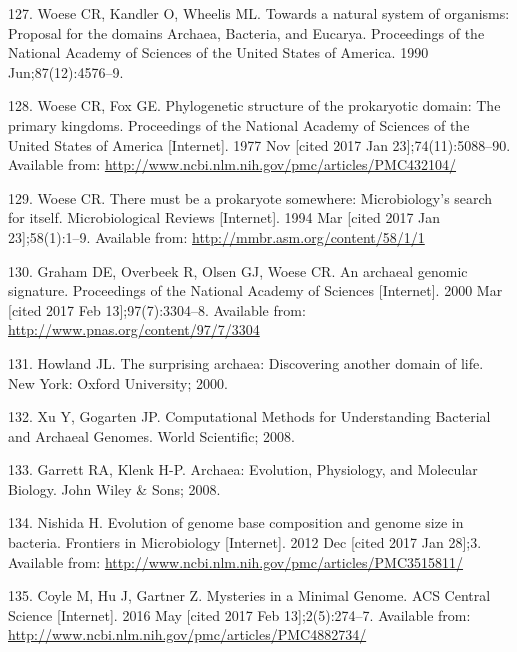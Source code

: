 \documentclass[12pt,twoside]{reedthesis}
\begin{document}
  \hypertarget{ref-woese_towards_1990}{}
  127. Woese CR, Kandler O, Wheelis ML. Towards a natural system of
  organisms: Proposal for the domains Archaea, Bacteria, and Eucarya.
  Proceedings of the National Academy of Sciences of the United States of
  America. 1990 Jun;87(12):4576--9.
  
  \hypertarget{ref-woese_phylogenetic_1977}{}
  128. Woese CR, Fox GE. Phylogenetic structure of the prokaryotic domain:
  The primary kingdoms. Proceedings of the National Academy of Sciences of
  the United States of America {[}Internet{]}. 1977 Nov {[}cited 2017 Jan
  23{]};74(11):5088--90. Available from:
  \url{http://www.ncbi.nlm.nih.gov/pmc/articles/PMC432104/}
  
  \hypertarget{ref-woese_there_1994}{}
  129. Woese CR. There must be a prokaryote somewhere: Microbiology's
  search for itself. Microbiological Reviews {[}Internet{]}. 1994 Mar
  {[}cited 2017 Jan 23{]};58(1):1--9. Available from:
  \url{http://mmbr.asm.org/content/58/1/1}
  
  \hypertarget{ref-graham_archaeal_2000}{}
  130. Graham DE, Overbeek R, Olsen GJ, Woese CR. An archaeal genomic
  signature. Proceedings of the National Academy of Sciences
  {[}Internet{]}. 2000 Mar {[}cited 2017 Feb 13{]};97(7):3304--8.
  Available from: \url{http://www.pnas.org/content/97/7/3304}
  
  \hypertarget{ref-howland_surprising_2000}{}
  131. Howland JL. The surprising archaea: Discovering another domain of
  life. New York: Oxford University; 2000.
  
  \hypertarget{ref-xu_computational_2008}{}
  132. Xu Y, Gogarten JP. Computational Methods for Understanding
  Bacterial and Archaeal Genomes. World Scientific; 2008.
  
  \hypertarget{ref-garrett_archaea_2008}{}
  133. Garrett RA, Klenk H-P. Archaea: Evolution, Physiology, and
  Molecular Biology. John Wiley \& Sons; 2008.
  
  \hypertarget{ref-nishida_evolution_2012}{}
  134. Nishida H. Evolution of genome base composition and genome size in
  bacteria. Frontiers in Microbiology {[}Internet{]}. 2012 Dec {[}cited
  2017 Jan 28{]};3. Available from:
  \url{http://www.ncbi.nlm.nih.gov/pmc/articles/PMC3515811/}
  
  \hypertarget{ref-coyle_mysteries_2016}{}
  135. Coyle M, Hu J, Gartner Z. Mysteries in a Minimal Genome. ACS
  Central Science {[}Internet{]}. 2016 May {[}cited 2017 Feb
  13{]};2(5):274--7. Available from:
  \url{http://www.ncbi.nlm.nih.gov/pmc/articles/PMC4882734/}
  
\end{document}
